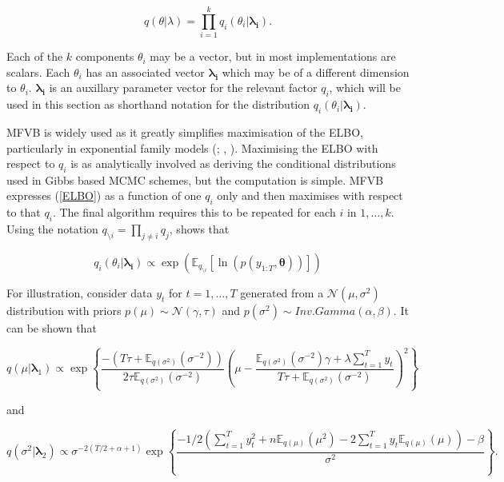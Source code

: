 \documentclass[12pt,a4paper]{article}%
\numberwithin{equation}{section}
\begin{document}
\begin{equation}
\label{mf1}
q(\theta|\lambda) = \prod_{i=1}^k q_i(\theta_i | \boldsymbol{\lambda_i}).
\end{equation}

Each of the $k$ components $\theta_i$ may be a vector, but in most implementations are scalars. Each $\theta_i$ has an associated vector $\boldsymbol{\lambda_i}$ which may be of a different dimension to $\theta_i$. $\boldsymbol{\lambda_i}$ is an auxillary parameter vector for the relevant factor $q_i$, which will be used in this section as shorthand notation for the distribution $q_i(\theta_i |\boldsymbol{\lambda_i})$. 

MFVB is widely used as it greatly simplifies maximisation of the ELBO, particularly in exponential family models (\citealp{Jordan1999}; \citealp{Ghahramani2000}, \citealp{Wainwright2008}).  Maximising the ELBO with respect to $q_i$ is as analytically involved as deriving the conditional distributions used in Gibbs based MCMC schemes, but the computation is simple. MFVB expresses (\ref{ELBO}) as a function of one $q_i$ only and then maximises with respect to that $q_i$. The final algorithm requires this to be repeated for each $i$ in $1, \dots, k$. Using the notation $q_{\setminus i} = \prod_{j\neq i}q_j$, \citet{Attias1999} shows that 

\begin{equation}
\label{mf2}
q_i(\theta_i |\boldsymbol{\lambda_i}) \propto\exp( \mathbb{E}_{q_{\setminus i}} [\ln(p(y_{1:T},\boldsymbol{\theta}))])
\end{equation}

For illustration, consider data $y_t$ for $t = 1, \dots, T$ generated from a $\mathcal{N}(\mu, \sigma^2)$ distribution with priors $p(\mu) \sim \mathcal{N}(\gamma, \tau)$ and $p(\sigma^2) \sim Inv.Gamma(\alpha, \beta)$. It can be shown that

\begin{equation}
\label{mf3}
q(\mu | \boldsymbol{\lambda}_1) \propto \exp \left\{ \frac{-(T\tau + \mathbb{E}_{q(\sigma^2)}(\sigma^{-2}))}{2\tau\mathbb{E}_{q(\sigma^2)}(\sigma^{-2})} \left( \mu - \frac{\mathbb{E}_{q(\sigma^2)}(\sigma^{-2})\gamma + \lambda \sum_{t=1}^{T} y_t}{T \tau + \mathbb{E}_{q(\sigma^2 )}(\sigma^{-2})} \right)^2 \right\}
\end{equation}

and

\begin{equation}
\label{mf4}
q(\sigma^2 | \boldsymbol{\lambda}_2) \propto \sigma^{-2(T/2 + \alpha + 1)} \exp \left\{ \frac{ -1/2(\sum_{t=1}^{T}y_t^2 + n\mathbb{E}_{q(\mu)}(\mu^2) - 2\sum_{t=1}^{T} y_t \mathbb{E}_{q(\mu)}(\mu)) - \beta}{\sigma^2} \right\}.
\end{equation}
\end{document}

